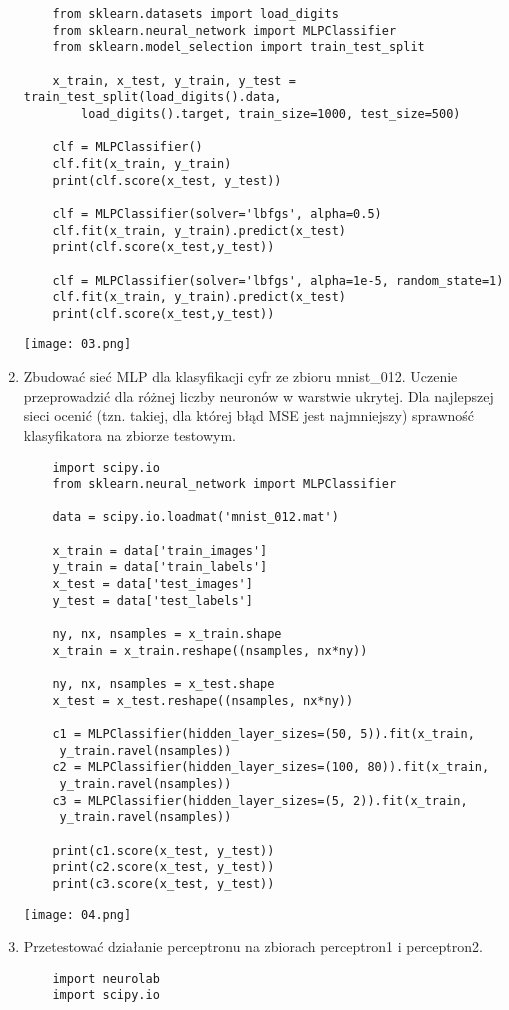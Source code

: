 \documentclass[12pt,a4paper]{article}
\begin{document}
\begin{enumerate}
                    \begin{verbatim}
    from sklearn.datasets import load_digits
    from sklearn.neural_network import MLPClassifier
    from sklearn.model_selection import train_test_split
     
    x_train, x_test, y_train, y_test = train_test_split(load_digits().data,
        load_digits().target, train_size=1000, test_size=500)
     
    clf = MLPClassifier()
    clf.fit(x_train, y_train)
    print(clf.score(x_test, y_test))
     
    clf = MLPClassifier(solver='lbfgs', alpha=0.5)
    clf.fit(x_train, y_train).predict(x_test)
    print(clf.score(x_test,y_test))
     
    clf = MLPClassifier(solver='lbfgs', alpha=1e-5, random_state=1)
    clf.fit(x_train, y_train).predict(x_test)
    print(clf.score(x_test,y_test))
                    \end{verbatim}
            \texttt{[image: 03.png]}
            \item Zbudować sieć MLP dla klasyfikacji cyfr ze zbioru mnist\_012. Uczenie przeprowadzić dla różnej liczby neuronów w warstwie ukrytej. Dla najlepszej sieci ocenić (tzn. takiej, dla której błąd MSE jest najmniejszy) sprawność klasyfikatora na zbiorze testowym.
                    \begin{verbatim}
    import scipy.io
    from sklearn.neural_network import MLPClassifier
     
    data = scipy.io.loadmat('mnist_012.mat')
     
    x_train = data['train_images']
    y_train = data['train_labels']
    x_test = data['test_images']
    y_test = data['test_labels']
     
    ny, nx, nsamples = x_train.shape
    x_train = x_train.reshape((nsamples, nx*ny))
     
    ny, nx, nsamples = x_test.shape
    x_test = x_test.reshape((nsamples, nx*ny))
     
    c1 = MLPClassifier(hidden_layer_sizes=(50, 5)).fit(x_train,
     y_train.ravel(nsamples))
    c2 = MLPClassifier(hidden_layer_sizes=(100, 80)).fit(x_train,
     y_train.ravel(nsamples))
    c3 = MLPClassifier(hidden_layer_sizes=(5, 2)).fit(x_train,
     y_train.ravel(nsamples))
     
    print(c1.score(x_test, y_test))
    print(c2.score(x_test, y_test))
    print(c3.score(x_test, y_test))
                    \end{verbatim}
            \texttt{[image: 04.png]}
            \item Przetestować działanie perceptronu na zbiorach perceptron1 i perceptron2.
                    \begin{verbatim}
    import neurolab
    import scipy.io
     

\end{verbatim}
\end{enumerate}
\end{document}
